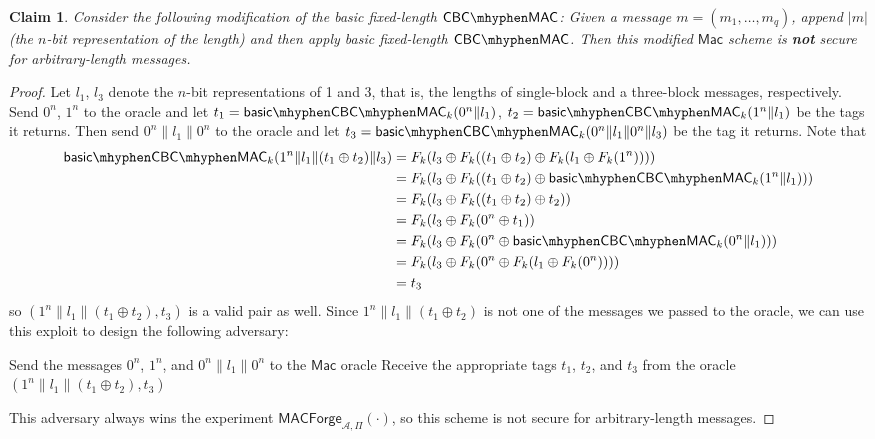 \documentclass[12pt]{article}
\numberwithin{equation}{section}
\theoremstyle{plain}
\newtheorem{claim}{Claim}
\newcommand{\algo}[1]{\mathsf{#1}}
\newcommand{\adv}{\mathcal{A}}
\newcommand{\mac}{\algo{Mac}}
\newcommand{\macexpir}[2]{\algo{MACForge}_{{#1},{#2}}}
\begin{document}
\begin{claim}
Consider the following modification of the basic fixed-length $\algo{CBC}\mhyphen \algo{MAC}$:
Given a message $m = (m_1, \ldots, m_q)$,
append $|m|$ (the $n$-bit representation of the length)
and then apply basic fixed-length $\algo{CBC}\mhyphen \algo{MAC}$.
Then this modified $\mac$ scheme is \textbf{not} secure for arbitrary-length messages.
\end{claim}
\begin{proof}
Let $l_1$, $l_3$ denote the $n$-bit representations of 1 and 3, that is,
the lengths of single-block and a three-block messages, respectively.
Send $0^n$, $1^n$ to the oracle and let
$t_1 = \algo{basic}\mhyphen \algo{CBC}\mhyphen \algo{MAC}_k(0^n \| l_1)$,
$t_2 = \algo{basic}\mhyphen \algo{CBC}\mhyphen \algo{MAC}_k(1^n \| l_1)$
be the tags it returns.
Then send $0^n \| l_1 \| 0^n$ to the oracle and let
$t_3 = \algo{basic}\mhyphen \algo{CBC}\mhyphen \algo{MAC}_k(0^n \| l_1 \| 0^n \| l_3)$
be the tag it returns.
Note that
\begin{align*}
    \algo{basic}\mhyphen \algo{CBC}\mhyphen \algo{MAC}_k(1^n \| l_1 \| (t_1 \oplus t_2) \| l_3)
        &= F_k(l_3 \oplus F_k((t_1 \oplus t_2) \oplus F_k(l_1 \oplus F_k(1^n))))\\
        &= F_k(l_3 \oplus F_k((t_1 \oplus t_2) \oplus \algo{basic}\mhyphen \algo{CBC}\mhyphen \algo{MAC}_k(1^n \| l_1)))\\
        &= F_k(l_3 \oplus F_k((t_1 \oplus t_2) \oplus t_2))\\
        &= F_k(l_3 \oplus F_k(0^n \oplus t_1))\\
        &= F_k(l_3 \oplus F_k(0^n \oplus \algo{basic}\mhyphen \algo{CBC}\mhyphen \algo{MAC}_k(0^n \| l_1)))\\
        &= F_k(l_3 \oplus F_k(0^n \oplus F_k(l_1 \oplus F_k(0^n))))\\
        &= t_3
\end{align*}
so $(1^n \| l_1 \| (t_1 \oplus t_2), t_3)$ is a valid pair as well.
Since $1^n \| l_1 \| (t_1 \oplus t_2)$ is not one of the messages we passed to the oracle,
we can use this exploit to design the following adversary:
\begin{algorithm}[H]
\begin{algorithmic}
    \State Send the messages $0^n$, $1^n$, and $0^n \| l_1 \| 0^n$ to the $\mac$ oracle
    \State Receive the appropriate tags $t_1$, $t_2$, and $t_3$ from the oracle
    \State \Return $(1^n \| l_1 \| (t_1 \oplus t_2), t_3)$
\EndProcedure
\end{algorithmic}
\end{algorithm}
This adversary always wins the experiment $\macexpir{\adv}{\Pi}(\cdot)$,
so this scheme is not secure for arbitrary-length messages.
\end{proof}
\end{document}
